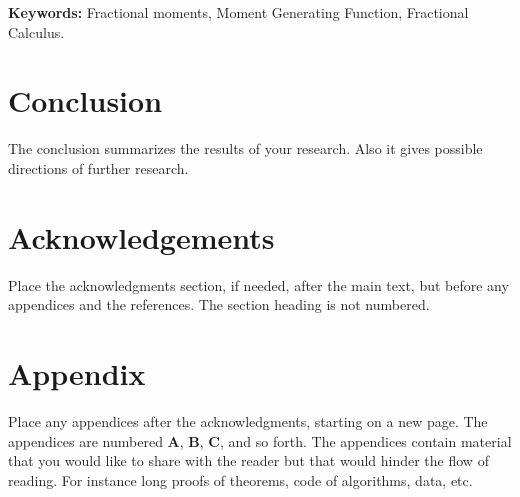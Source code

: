 \documentclass[a4paper,11pt]{article}
\theoremstyle{plain}
\numberwithin{theorem}{subsection}
\numberwithin{corollary}{subsection}
\numberwithin{proposition}{subsection}
\numberwithin{lemma}{subsection}
\numberwithin{assumption}{subsection}
\theoremstyle{definition}
\numberwithin{definition}{subsection}
\numberwithin{example}{subsection}
\numberwithin{remark}{subsection}
\numberwithin{notation}{subsection}
\begin{document}
\bigskip\noindent
\textbf{Keywords:} Fractional moments, Moment Generating Function, Fractional Calculus.












\section{Conclusion}\label{s:con}
The conclusion summarizes the results of your research.
Also it gives possible directions of further research.

\section*{Acknowledgements}
Place the acknowledgments section, if needed, after the main text, 
but before any appendices and the references. The section heading is not numbered.

\appendix


\section{Appendix}\label{s:app1}
Place any appendices after the acknowledgments, starting on a new page.
The appendices are numbered
\textbf{A}, \textbf{B}, \textbf{C}, and so forth.
The appendices contain material that you would like to share with the
reader but that would hinder the flow of reading. For instance long
proofs of theorems, code of algorithms, data, etc.




\end{document}
